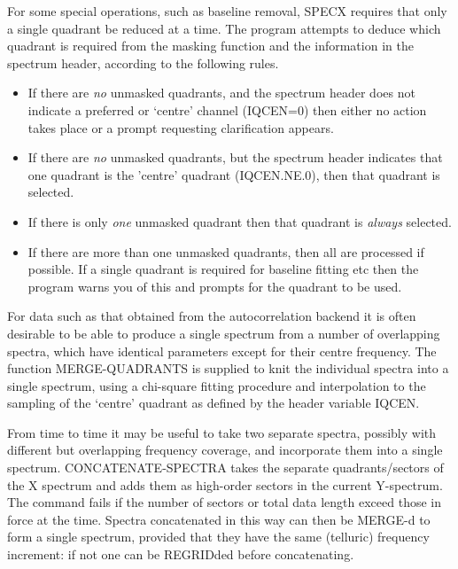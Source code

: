 \documentclass[11pt,twoside]{report}
\begin{document}
For some special operations, such as baseline removal, 
SPECX requires that only a single quadrant be reduced
at a time. The program attempts to deduce which quadrant is required from the
masking function and the information in the spectrum header, according to the
following rules. 
\begin{itemize}
\item If there are {\em no} unmasked quadrants, and the spectrum header does
not indicate a preferred or `centre' channel (IQCEN=0)  then
either no action takes place or a prompt requesting clarification appears. 
\item If there are {\em no} unmasked quadrants, but the spectrum header
indicates that one quadrant is the 'centre' quadrant (IQCEN.NE.0), then that
quadrant is selected. 
\item If there is only {\em one} unmasked quadrant then that quadrant is 
{\em always} selected.
\item If there are more than one unmasked quadrants, then all are processed if
possible. If a single quadrant is required for baseline fitting etc then
the program warns you of this and prompts for the quadrant to be used.
\end{itemize}

For data such as that obtained from the autocorrelation backend
 it is often desirable to be able to produce a single
spectrum from a number of overlapping spectra, which have identical parameters
except for their centre frequency. The function MERGE-QUADRANTS is supplied to
knit  the individual spectra into a single spectrum,
using a chi-square fitting procedure and interpolation to the sampling of the
`centre' quadrant as defined by the header variable IQCEN. 

From time to time it may be useful to take two separate spectra, possibly
with different but overlapping frequency coverage, and incorporate them into
a single spectrum. CONCATENATE-SPECTRA takes the separate quadrants/sectors
of the X spectrum and adds them as high-order sectors in the current Y-spectrum.
The command fails if the number of sectors or total data length exceed those in
force at the time. Spectra concatenated in this way can then be MERGE-d
 to form a single spectrum, provided that they have the
same (telluric) frequency increment: if not one can be REGRIDded
 before concatenating.
\end{document}
